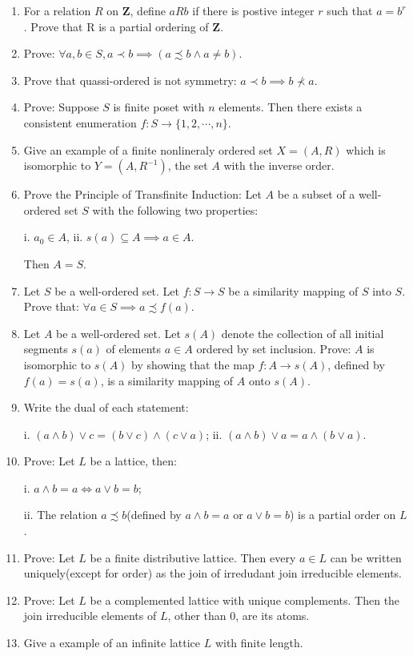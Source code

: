 \documentclass{article}
\begin{document}
\begin{enumerate}
  \item For a relation $R$ on $\mathbf{Z}$,
  define $aRb$ if there is postive integer $r$ such that $a = b^r$.
  Prove that R is a partial ordering of $\mathbf{Z}$.

  \item Prove:
  $
  \forall a, b \in S, a\prec b \implies (a\precsim b \land a \neq b)
  $.

  \item Prove that quassi-ordered is not symmetry: $a\prec b \implies b \not\prec a$.

  \item Prove: Suppose $S$ is finite poset with $n$ elements.
  Then there exists a consistent enumeration $f: S\to \{1, 2, \cdots, n\}$.

  \item Give an example of a finite nonlineraly ordered set $X = (A, R)$ which is
  isomorphic to $Y = (A, R^{-1})$, the set $A$ with the inverse order.

  \item Prove the Principle of Transfinite Induction:
  Let $A$ be a subset of a well-ordered set $S$
  with the following two properties:

  i. $a_0 \in A$, ii. $s(a) \subseteq A \implies a \in A$.

  Then $A = S$.

  \item Let $S$ be a well-ordered set. Let $f: S\to S$ be a similarity mapping of $S$ into $S$.
  Prove that: $\forall a \in S \implies a \precsim f(a)$.

  \item Let $A$ be a well-ordered set. Let $s(A)$ denote the collection of
  all initial segments $s(a)$ of elements $a\in A$ ordered by set inclusion.
  Prove: $A$ is isomorphic to $s(A)$ by showing that the map $f: A\to s(A)$,
  defined by $f(a) = s(a)$, is a similarity mapping of $A$ onto $s(A)$.

  \item Write the dual of each statement:

  i. $(a\land b)\lor c = (b\lor c)\land(c\lor a)$;
  ii. $(a\land b)\lor a = a\land(b\lor a)$.

  \item Prove: Let $L$ be a lattice, then:

  i. $a \land b = a \iff a \lor b = b$;

  ii. The relation $a\precsim b$(defined by $a\land b = a$ or $a\lor b = b$)
  is a partial order on $L$.

  \item Prove: Let $L$ be a finite distributive lattice.
  Then every $a\in L$ can be written uniquely(except for order)
  as the join of irredudant join irreducible elements.

  \item Prove: Let $L$ be a complemented lattice with unique complements.
  Then the join irreducible elements of $L$, other than $0$, are its atoms.

  \item Give a example of an infinite lattice $L$ with finite length.
\end{enumerate}
\end{document}
